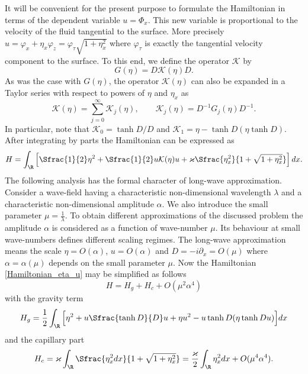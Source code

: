 It will be convenient for the present purpose to formulate the Hamiltonian
in terms of the dependent variable $u = \Phi_x$.
This new variable is proportional to the velocity of the fluid
tangential to the surface.
More precisely
\(
	u = \varphi_x + \eta_x \varphi_z
	= \varphi _{\tau} \sqrt{1 + \eta_x^2}
\)
where $\varphi _{\tau}$ is exactly the tangential
velocity component to the surface.
To this end, we define the operator $\mathcal{K}$ by
%
\begin{equation*}
	G(\eta) = D \mathcal{K}(\eta) D
	.
\end{equation*}
%
As was the case with $G(\eta)$, the operator $\mathcal{K}(\eta)$ 
can also be expanded in a Taylor series
with respect to powers of $\eta$ and $\eta_x$ as
%
\[
	\mathcal{K}(\eta) = \sum_{j=0}^\infty \mathcal{K}_j(\eta)
	, \qquad
	\mathcal{K}_j(\eta) = D^{-1}G_j(\eta)D^{-1}
	.
\]
%
In particular, note that $\mathcal{K}_0 = \tanh{D} / D$
and
$\mathcal{K}_1 = \eta - \tanh{D} (\eta \tanh{D})$.
After integrating by parts the Hamiltonian can be expressed as 
%
\begin{equation}
\label{Hamiltonian_eta_u}
	H  = \int_\R \Big[ \Sfrac{1}{2} \eta^2 + \Sfrac{1}{2} u \mathcal K(\eta) u
	+ \varkappa \Sfrac{ \eta_x^2 }{ 1 + \sqrt{1 + \eta_x^2} }	
	\Big] \, dx
	.
\end{equation}
%
The following analysis has the formal character of long-wave approximation.
Consider a wave-field having a characteristic non-dimensional wavelength
$\lambda$ and a characteristic non-dimensional amplitude $\alpha$.
We also introduce the small parameter $\mu = \frac{1}{\lambda}$.
To obtain different approximations of the discussed problem
the amplitude $\alpha$ is considered as a function of wave-number $\mu$.
Its behaviour at small wave-numbers defines different scaling regimes.
The long-wave approximation means the scale $\eta = O(\alpha)$,
$u = O(\alpha)$ and $D = - i \partial_x = O(\mu)$
where $\alpha = \alpha(\mu)$ depends on the small parameter $\mu$.
Now the Hamiltonian \eqref{Hamiltonian_eta_u} may be simplified as follows
%
\begin{equation}
\label{Hamiltonian_expansion}
	H = H_g + H_c + O(\mu^2 \alpha^4)
\end{equation}
%
with the gravity term
%
\begin{equation}
\label{Hamiltonian0}
	H_g =
	\frac 12 \int_\R
	\Big[
		\eta^2 + u \Sfrac{\tanh D}{D} u + \eta u^2 -
		u \tanh{D} (\eta \tanh{D} u)
	\Big]
	dx
\end{equation}
%
and the capillary part
%
\begin{equation}
\label{Hamiltonian1}
	H_c
	=
	\varkappa \int_\R \Sfrac{ \eta_x^2 dx }{ 1 + \sqrt{1 + \eta_x^2} }	
	=
	\frac{\varkappa}{2} \int_\R \eta_x^2 dx 
	+ O(\mu^4 \alpha^4)
	.
\end{equation}
